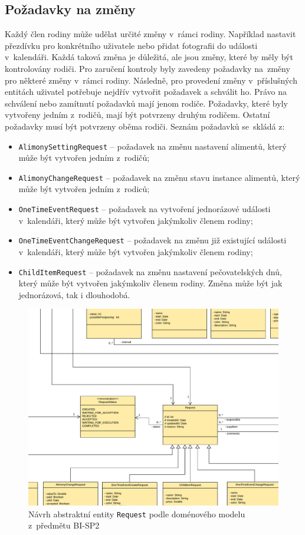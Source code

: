     \subsection{Požadavky na změny}
        Každý člen rodiny může udělat určité změny v~rámci rodiny. Například nastavit přezdívku pro konkrétního uživatele nebo přidat fotografii do události v~kalendáři. Každá taková změna je důležitá, ale jsou změny, které by měly být kontrolovány rodiči. Pro zaručení kontroly byly zavedeny požadavky na~změny pro některé změny v~rámci rodiny. Následně, pro provedení změny v~příslušných entitách uživatel potřebuje nejdřív vytvořit požadavek a schválit ho.
        Právo na schválení nebo zamítnutí požadavků mají jenom rodiče. Požadavky, které byly vytvořeny jedním z~rodičů, mají být potvrzeny druhým rodičem. Ostatní požadavky musí být potvrzeny oběma rodiči. Seznám požadavků se~skládá z:
        \begin{itemize}
            \item \texttt{AlimonySettingRequest} -- požadavek na změnu nastavení alimentů, který může být vytvořen jedním z~rodičů;
            \item \texttt{AlimonyChangeRequest} -- požadavek na změnu stavu instance alimentů, který může být vytvořen jedním z~rodiců;
            \item \texttt{OneTimeEventRequest} -- požadavek na vytvoření jednorázové události v~kalendáři, který může být vytvořen jakýmkoliv členem rodiny;
            \item \texttt{OneTimeEventChangeRequest} -- požadavek na změnu již existující události v~kalendáři, který může být vytvořen jakýmkoliv členem rodiny;
            \item \texttt{ChildItemRequest} -- požadavek na změnu nastavení pečovatelských dnů, který může být vytvořen jakýmkoliv členem rodiny. Změna může být jak jednorázová, tak i dlouhodobá.
        \end{itemize}
        \begin{figure}\centering
	        \includegraphics[width=1.0\textwidth]{pdfs/Abstr-Requrest1}
	        \caption[Návrh abstraktní entity \texttt{Request}]{Návrh abstraktní entity \texttt{Request} podle doménového modelu z~předmětu BI-SP2}\label{image:abstr-request1}
        \end{figure}
